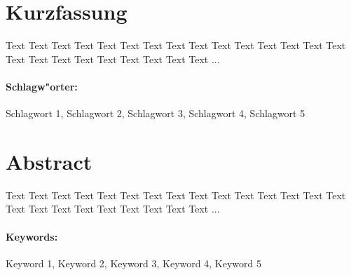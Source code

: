\section*{\centering Kurzfassung}
Text Text Text Text Text Text Text Text Text Text Text Text Text Text Text Text Text Text Text Text Text Text Text Text ...

\paragraph*{Schlagw"orter:} Schlagwort 1, Schlagwort 2, Schlagwort 3, Schlagwort 4, Schlagwort 5
\newpage

\section*{\centering Abstract}
Text Text Text Text Text Text Text Text Text Text Text Text Text Text Text Text Text Text Text Text Text Text Text Text ...

\paragraph*{Keywords:} Keyword 1, Keyword 2, Keyword 3, Keyword 4, Keyword 5

\newpage
